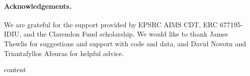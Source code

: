 \documentclass{article}
\begin{document}
\paragraph{Acknowledgements.} We are grateful for the support provided by EPSRC AIMS CDT, ERC 677195-IDIU, and the Clarendon Fund scholarship. We would like to thank James Thewlis for suggestions and support with code and data, and David Novotn and Triantafyllos Afouras for helpful advice.


\clearpage

%

\clearpage
\appendix
{content}\clearpage
\end{document}
